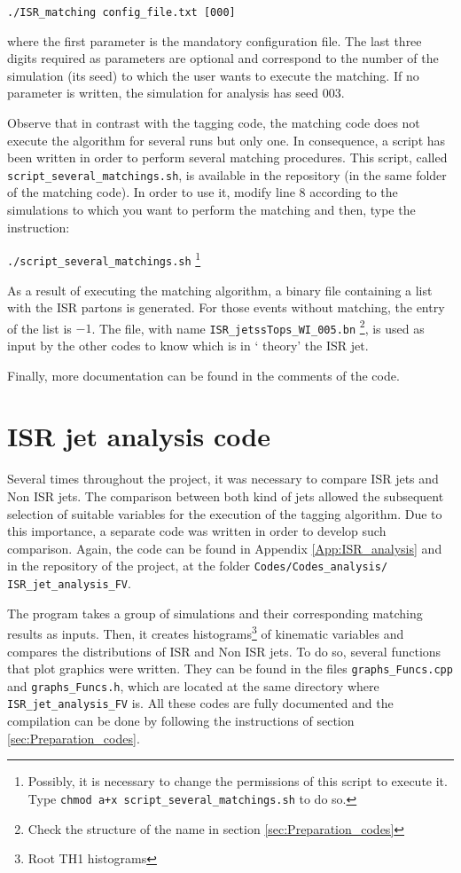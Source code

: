 \documentclass[12pt, oneside]{book}              %
\begin{document}
\texttt{./ISR\_matching config\_file.txt [000]}

where the first parameter is the mandatory configuration file. The last three 
digits required as parameters are optional and correspond to the number of the
simulation (its seed) to which the user wants to execute the matching. If no
parameter is written, the simulation for analysis has seed 003.

Observe that in contrast with the tagging code, the matching code does not 
execute the algorithm for several runs but only one. In consequence, a script 
has been  written in order to perform several matching procedures. This script,
called \texttt{script\_several\_matchings.sh}, is available in the repository
(in the same folder of the matching code). In order to use it, modify line 8 
according to the simulations to which you want to perform the matching and then,
type the instruction:

\texttt{./script\_several\_matchings.sh} \footnote{Possibly, it is necessary
	to change the permissions of this script to execute it. Type \texttt{chmod
		a+x script\_several\_matchings.sh} to do so.}

As a result of executing the matching algorithm, a binary file containing a
list with the ISR partons is generated. For those events without matching,
the entry of the list is $ -1 $. The file, with name \texttt{ISR\_jetssTops\_WI\_005.bn}
\footnote{Check the structure of the name in section \ref{sec:Preparation_codes}},
is used as input by the other codes to know which is in \textquoteleft 
theory' the ISR jet.

Finally, more documentation can be found in the comments of the code.

\section{ISR jet analysis code} \label{sec:ISR_analysys}

Several times throughout the project, it was necessary to compare ISR jets
and Non ISR jets. The comparison between both kind of jets allowed the
subsequent selection of suitable variables for the execution of 
the tagging algorithm. Due to this importance, a separate code was written
in order to develop such comparison. Again, the code can be found in 
Appendix \ref{App:ISR_analysis}  and in the repository of the project, at 
the folder \texttt{Codes/Codes\_analysis/ ISR\_jet\_analysis\_FV}.

The program takes a group of simulations and their corresponding matching
results  as inputs. Then, it creates histograms\footnote{Root TH1 histograms}
of kinematic variables and compares the distributions of ISR and Non ISR
jets. To do so, several functions that plot graphics were written. They can be 
found in the files \texttt{graphs\_Funcs.cpp} and \texttt{graphs\_Funcs.h},
which are located at the same directory where \texttt{ISR\_jet\_analysis\_FV}
is. All these codes are fully documented and the compilation can be done by
following the instructions of section \ref{sec:Preparation_codes}.
\end{document}
